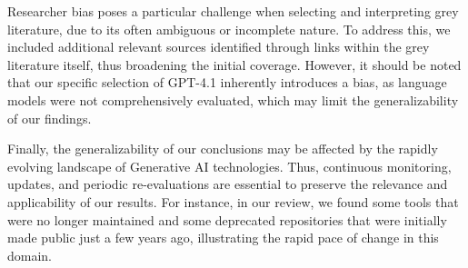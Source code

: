 Researcher bias poses a particular challenge when selecting and interpreting grey literature, due to its often ambiguous or incomplete nature. To address this, we included additional relevant sources identified through links within the grey literature itself, thus broadening the initial coverage. However, it should be noted that our specific selection of GPT-4.1 inherently introduces a bias, as language models were not comprehensively evaluated, which may limit the generalizability of our findings.

Finally, the generalizability of our conclusions may be affected by the rapidly evolving landscape of Generative AI technologies. Thus, continuous monitoring, updates, and periodic re-evaluations are essential to preserve the relevance and applicability of our results. For instance, in our review, we found some tools that were no longer maintained and some deprecated repositories that were initially made public just a few years ago, illustrating the rapid pace of change in this domain. 

